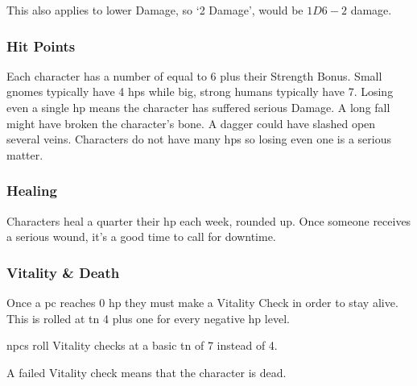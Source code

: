 \begin{multicols}{2}
This also applies to lower Damage, so `2 Damage', would be $1D6-2$ damage.

\subsubsection{Hit Points}

Each character has a number of  equal to 6 plus their Strength Bonus.
Small gnomes typically have 4 \glspl{hp} while big, strong humans typically have 7.
Losing even a single \gls{hp} means the character has suffered serious Damage.
A long fall might have broken the character's bone.
A dagger could have slashed open several veins.
Characters do not have many \glspl{hp} so losing even one is a serious matter.

\subsubsection{Healing}
Characters heal a quarter their \gls{hp} each week, rounded up.
Once someone receives a serious wound, it's a good time to call for \gls{downtime}.

\subsubsection{Vitality \& Death}
Once a \gls{pc} reaches 0 \gls{hp} they must make a 
Vitality Check in order to stay alive.
This is rolled at \gls{tn} 4 plus one for every negative \gls{hp} level.
\iftoggle{verbose}%
  {\footnote{Traits such as Strength do not affect the Vitality check because in a way, they already have.
  Stronger characters already have more \gls{hp}, which has already kept them farther from death.}
  For example, if someone with 3 \glspl{hp} left were to take a further 6 Damage, this would put them at -3 \glspl{hp}.
  That makes the \gls{tn} 7 for the Vitality Check.
}{}%

\Glspl{npc} roll Vitality checks at a basic \gls{tn} of 7 instead of 4.

A failed Vitality check means that the character is dead.%
\iftoggle{verbose}{%
  \footnote{See page \pageref{pcdeath} on what to do once a \gls{pc} dies.}%
}{%
  The player then selects one of the \glspl{npc} introduced through spending \glspl{storypoint} to play.
  That second character begins with half the \glspl{xp} of whichever \gls{pc} in the group has accumulated the most total \glspl{xp}.
  The player taking control of the \gls{npc} should spend any additional experience this grants immediately.

}
\end{multicols}
